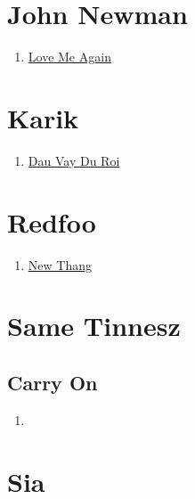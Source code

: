 \documentclass{book}
\numberwithin{equation}{section}
\begin{document}

\chapter{John Newman}
\begin{enumerate}
    \item \href{https://www.youtube.com/watch?v=CfihYWRWRTQ}{Love Me Again}
\end{enumerate}


\chapter{Karik}
\begin{enumerate}
    \item \href{https://www.youtube.com/watch?v=amyPCmf9jrw}{Dau Vay Du Roi}
\end{enumerate}


\chapter{Redfoo}
\begin{enumerate}
    \item \href{https://www.youtube.com/watch?v=xGiBiHocSZM}{New Thang}
\end{enumerate}


\chapter{Same Tinnesz}

\section{Carry On}
\begin{enumerate}
    \item 
\end{enumerate}


\chapter{Sia}
\end{document}
